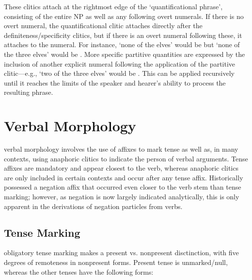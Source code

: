 \documentclass[a4paper,11pt,oneside,openany]{memoir}
\begin{document}
These clitics attach at the rightmost edge of the `quantificational phrase', consisting of the entire NP as well as any following overt numerals. If there is no overt numeral, the quantificational clitic attaches directly after the definiteness/specificity clitics, but if there is an overt numeral following these, it attaches to the numeral. For instance, `none of the elves' would be  but `none of the three elves' would be . More specific partitive quantities are expressed by the inclusion of another explicit numeral following the application of the partitive clitic---e.g., `two of the three elves' would be . This can be applied recursively until it reaches the limits of the speaker and hearer's ability to process the resulting phrase.

\section{Verbal Morphology}

\parentlang{} verbal morphology involves the use of affixes to mark tense as well as, in many contexts, using anaphoric clitics to indicate the person of verbal arguments. Tense affixes are mandatory and appear closest to the verb, whereas anaphoric clitics are only included in certain contexts and occur after any tense affix. Historically \parentlang{} possessed a negation affix that occurred even closer to the verb stem than tense marking; however, as negation is now largely indicated analytically, this is only apparent in the derivations of negation particles from \parentlang{} verbs.

\subsection{Tense Marking}

\parentlang{} obligatory tense marking makes a present vs. nonpresent disctinction, with five degrees of remoteness in nonpresent forms. Present tense is unmarked/null, whereas the other tenses have the following forms:
\end{document}
